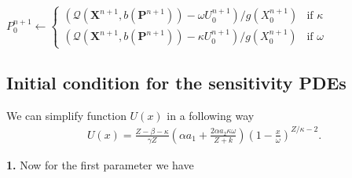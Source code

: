 \documentclass{article}
\begin{document}
\begin{algorithm}
\begin{algorithmic}
    \State $P_0^{n+1} \gets \begin{cases} \left(\mathcal{Q}(\mathbf{X}^{n+1},b(\mathbf{P}^{n+1})) - \omega U_0^{n+1} \right) / g(X_0^{n+1}) & \text{if } \kappa \\ \left(\mathcal{Q}(\mathbf{X}^{n+1},b(\mathbf{P}^{n+1})) - \kappa U_0^{n+1} \right) / g(X_0^{n+1}) & \text{if } \omega \end{cases}$
  \end{algorithmic}
\end{algorithm}

\clearpage
\begin{appendices}
\section{Initial condition for the sensitivity PDEs}\label{app:spdei}

We can simplify function $U(x)$ in a following way
\begin{equation}\label{eq:U2}
 \begin{split}
  U(x) = \frac{Z-\beta-\kappa}{\gamma Z}\left(\alpha a_1 + \frac{2\alpha a_2 \kappa\omega}{Z+k}\right)\left(1-\frac{x}{\omega}\right)^{Z/\kappa-2}.
  \end{split}
\end{equation}

{\bf 1.} Now for the first parameter we have


\end{appendices}
\end{document}

